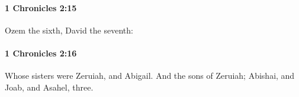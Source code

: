 		\paragraph{1 Chronicles 2:15} %
			\label{1CHRONICLES-2-15}

			Ozem the sixth, David the seventh:


		\paragraph{1 Chronicles 2:16} %
			\label{1CHRONICLES-2-16}

			Whose sisters were Zeruiah, and Abigail. And the sons of Zeruiah; Abishai, and Joab, and Asahel, three.


